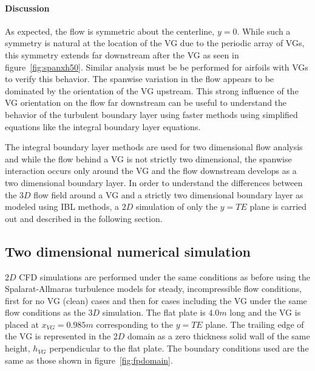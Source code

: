 \paragraph{Discussion}
As expected, the flow is symmetric about the centerline, $y=0$. While such a symmetry is natural at the location of the VG due to the periodic array of VGs, this symmetry extends far downstream after the VG as seen in figure~\ref{fig:spanxh50}. Similar analysis must be be performed for airfoils with VGs to verify this behavior. The spanwise variation in the flow appears to be dominated by the orientation of the VG upstream. This strong influence of the VG orientation on the flow far downstream can be useful to understand the behavior of the turbulent boundary layer using faster methods using simplified equations like the integral boundary layer equations. 

The integral boundary layer methods are used for two dimensional flow analysis and while the flow behind a VG is not strictly two dimensional, the spanwise interaction occurs only around the VG and the flow downstream develops as a two dimensional boundary layer. 
In order to understand the differences between the $3D$ flow field around a VG and a strictly two dimensional boundary layer as modeled using IBL methods, a $2D$ simulation of only the $y=TE$ plane is carried out and described in the following section.

\subsection{Two dimensional numerical simulation}
$2D$ CFD simulations are performed under the same conditions as before using the Spalarat-Allmaras turbulence models for steady, incompressible flow conditions, first for no VG (clean) cases and then for cases including the VG under the same flow conditions as the $3D$ simulation. The flat plate is $4.0 m$ long and the VG is placed at $x_{VG}=0.985m$ corresponding to the $y=TE$ plane. The trailing edge of the VG is represented in the $2D$ domain as a zero thickness solid wall of the same height, $h_{VG}$ perpendicular to the flat plate. The boundary conditions used are the same as those shown in figure~\ref{fig:fpdomain}.

